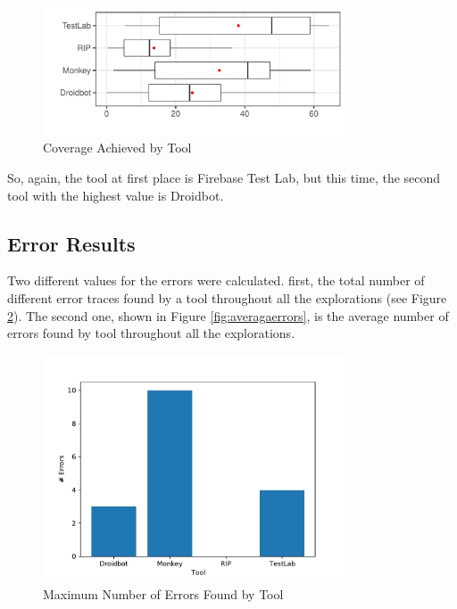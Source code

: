\begin{figure}[h]
\centering
\includegraphics[width=0.8\textwidth]{../Figures/boxplotAccumulated.pdf}
\caption{Coverage Achieved by Tool}\label{fig:boxplotAccumulated}
\end{figure}

So, again, the tool at first place is Firebase Test Lab, but this time, the second tool with the highest value is Droidbot.

\subsection{Error Results}\label{sec:errorResults}

Two different values for the errors were calculated. first, the total number of different error traces found by a tool throughout all the explorations (see Figure \ref{fig:maxerrors}). The second one, shown in Figure \ref{fig:averagaerrors}, is the average number of errors found by tool throughout all the explorations. 

\begin{figure}[h]
\centering
\includegraphics[width=0.8\textwidth]{../Figures/maxErrors.pdf}
\caption{Maximum Number of Errors Found by Tool}\label{fig:maxerrors}
\end{figure}

